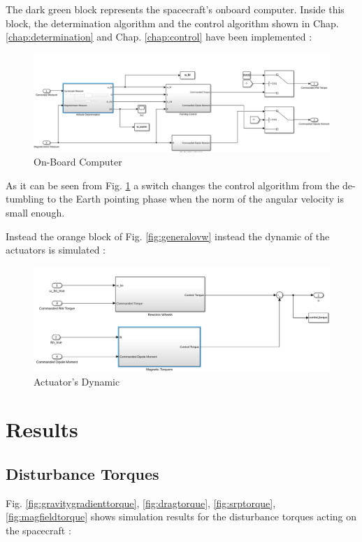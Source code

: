 \documentclass[11pt,a4paper]{report}
\begin{document}
The dark green block represents the spacecraft's onboard computer. Inside this block, the determination algorithm and the control algorithm shown in Chap. \ref{chap:determination} and Chap. \ref{chap:control} have been implemented : 

\begin{figure}[H]
 \centering
 \includegraphics[scale=0.4]{gfx/simulink/computer.png}
 \caption{On-Board Computer} 
 \label{fig:computer}
\end{figure}


As it can be seen from Fig. \ref{fig:computer} a switch changes the control algorithm from the de-tumbling to the Earth pointing phase when the norm of the angular velocity is small enough.

Instead the orange block of Fig. \ref{fig:generalovw} instead the dynamic of the actuators is simulated :

\begin{figure}[H]
 \centering
 \includegraphics[scale=0.4]{gfx/simulink/actuators_inside.png}
 \caption{Actuator's Dynamic} 
 \label{fig:actuatordynamics}
\end{figure}

\chapter{Results}

\section{Disturbance Torques}
Fig. \ref{fig:gravitygradienttorque}, \ref{fig:dragtorque}, \ref{fig:srptorque}, \ref{fig:magfieldtorque} shows simulation results for the disturbance torques acting on the spacecraft : 
\end{document}

